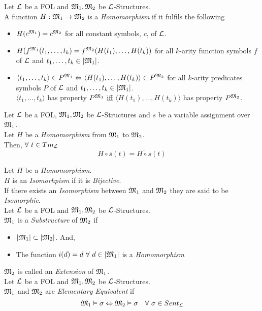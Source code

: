 \documentclass[11pt,a4paper]{article}
\begin{document}
Let $\mathcal{L}$ be a FOL and $\mathfrak{M}_1,\mathfrak{M}_2$ be $\mathcal{L}$-Structures.\\
A function $H:\mathfrak{M}_1\to\mathfrak{M}_2$ is a \textit{Homomorphism} if it fulfils the following
\begin{itemize}
	\item $H(c^{\mathfrak{M}_1})=c^{\mathfrak{M}_2}$ for all constant symbols, $c$, of $\mathcal{L}$.
	\item $H(f^{\mathfrak{M}_1}(t_1,\dots,t_k)=f^{\mathfrak{M}_2}(H(t_1),\dots,H(t_k))$ for all $k$-arity function symbols $f$ of $\mathcal{L}$ and $t_1,\dots,t_k\in|\mathfrak{M}_1|$.
	\item $\langle t_1,\dots,t_k\rangle\in P^{\mathfrak{M}_1}\Leftrightarrow\langle H(t_1),\dots,H(t_k)\rangle\in P^{\mathfrak{M}_2}$ for all $k$-arity predicates symbols $P$ of $\mathcal{L}$ and $t_1,\dots,t_k\in|\mathfrak{M}_1|$.\\
	\ie $\langle t_1,\dots,t_k\rangle$ has property $P^{\mathfrak{M}_1}$ \underline{iff} $\langle H(t_1),\dots,H(t_k)\rangle$ has property $P^{\mathfrak{M}_2}$.
\end{itemize}

Let $\mathcal{L}$ be a FOL, $\mathfrak{M}_1,\mathfrak{M}_2$ be $\mathcal{L}$-Structures and $s$ be a variable assignment over $\mathfrak{M}_1$.\\
Let $H$ be a \textit{Homomorphism} from $\mathfrak{M}_1$ to $\mathfrak{M}_2$.\\
Then, $\forall\ t\in Tm_{\mathcal{L}}$
$$H\circ\overline{s}(t)=\overline{H\circ s}(t)$$

Let $H$ be a \textit{Homomorphism}.\\
$H$ is an \textit{Isomorhpism} if it is \textit{Bijective}.\\
\nb If there exists an \textit{Isomorphism} between $\mathfrak{M}_1$ and $\mathfrak{M}_2$ they are said to be \textit{Isomorphic}.\\

Let $\mathcal{L}$ be a FOL and $\mathfrak{M}_1,\mathfrak{M}_2$ be $\mathcal{L}$-Structures.\\
$\mathfrak{M}_1$ is a \textit{Substructure} of $\mathfrak{M}_2$ if
\begin{itemize}
	\item $|\mathfrak{M}_1|\subset|\mathfrak{M}_2|$. And,
	\item The function $i(d)=d\ \forall\ d\in|\M_1|$ is a \textit{Homomorphism}
\end{itemize}
\nb $\mathfrak{M}_2$ is called an \textit{Extension} of $\mathfrak{M}_1$.\\

Let $\mathcal{L}$ be a FOL and $\mathfrak{M}_1,\mathfrak{M}_2$ be $\mathcal{L}$-Structures.\\
$\mathfrak{M}_1$ and $\mathfrak{M}_2$ are \textit{Elementary Equivalent} if
$$\M_1\vDash\sigma\Leftrightarrow\M_2\vDash\sigma\quad\forall\ \sigma\in Sent_\LL$$
\end{document}

